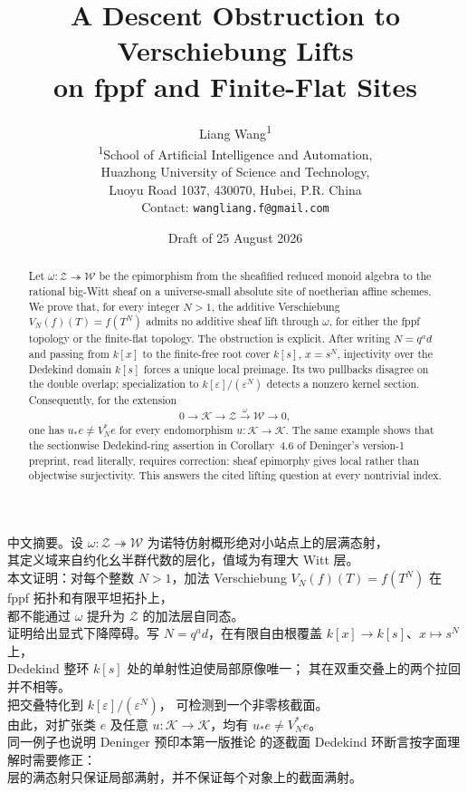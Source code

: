 \documentclass[11pt]{article}
\title{\textbf{A Descent Obstruction to Verschiebung Lifts\\
on fppf and Finite-Flat Sites}}
\author{Liang Wang\textsuperscript{1}\\
\small \textsuperscript{1}School of Artificial Intelligence and Automation,\\
\small Huazhong University of Science and Technology,\\
\small Luoyu Road 1037, 430070, Hubei, P.R. China\\
\small Contact: \texttt{wangliang.f@gmail.com}}
\date{Draft of 25 August 2026}
\theoremstyle{definition}
\newcommand{\latin}[1]{{\rmfamily #1}}
\begin{document}
\maketitle

\begin{abstract}
Let \(\omega\colon\mathcal Z\twoheadrightarrow\mathcal W\) be the
epimorphism from the sheafified reduced monoid algebra to the rational
big-Witt sheaf on a universe-small absolute site of noetherian affine
schemes.  We prove that, for every integer \(N>1\), the additive
Verschiebung \(V_N(f)(T)=f(T^N)\) admits no additive sheaf lift through
\(\omega\), for either the fppf topology or the finite-flat topology.
The obstruction is explicit.  After writing \(N=q^a d\) and passing from
\(k[x]\) to the finite-free root cover \(k[s]\), \(x=s^N\), injectivity
over the Dedekind domain \(k[s]\) forces a unique local preimage.  Its two
pullbacks disagree on the double overlap; specialization to
\(k[\varepsilon]/(\varepsilon^N)\) detects a nonzero kernel section.
Consequently, for the extension
\[
0\longrightarrow\mathcal K\longrightarrow\mathcal Z
 \xrightarrow{\omega}\mathcal W\longrightarrow0,
\]
one has \(u_*e\ne V_N^*e\) for every endomorphism
\(u\colon\mathcal K\to\mathcal K\).  The same example shows that the
sectionwise Dedekind-ring assertion in Corollary~4.6 of Deninger's
version-1 preprint, read literally, requires correction: sheaf
epimorphy gives local rather than objectwise surjectivity.
This answers the cited lifting question at every nontrivial index.
\end{abstract}

\begin{center}
\begin{minipage}{0.94\textwidth}
{\zhfont\small\RaggedRight
中文摘要。设 \(\omega\colon\mathcal Z\twoheadrightarrow\mathcal W\)
为诺特仿射概形绝对小站点上的层满态射，\\
其定义域来自约化幺半群代数的层化，值域为有理大
\latin{Witt} 层。\\
本文证明：对每个整数 \(N>1\)，加法 \latin{Verschiebung}
\(V_N(f)(T)=f(T^N)\) 在 \latin{fppf} 拓扑和有限平坦拓扑上，\\
都不能通过 \(\omega\) 提升为 \(\mathcal Z\) 的加法层自同态。\\
证明给出显式下降障碍。写 \(N=q^a d\)，在有限自由根覆盖
\(k[x]\to k[s]\)、\(x\mapsto s^N\) 上，\\
\latin{Dedekind} 整环 \(k[s]\) 处的单射性迫使局部原像唯一；
其在双重交叠上的两个拉回并不相等。\\
把交叠特化到 \(k[\varepsilon]/(\varepsilon^N)\)，
可检测到一个非零核截面。\\
由此，对扩张类 \(e\) 及任意
\(u\colon\mathcal K\to\mathcal K\)，均有 \(u_*e\ne V_N^*e\)。\\
同一例子也说明 \latin{Deninger} 预印本第一版推论 \latin{4.6}
的逐截面 \latin{Dedekind} 环断言按字面理解时需要修正：\\
层的满态射只保证局部满射，并不保证每个对象上的截面满射。
}
\end{minipage}
\end{center}
\end{document}
